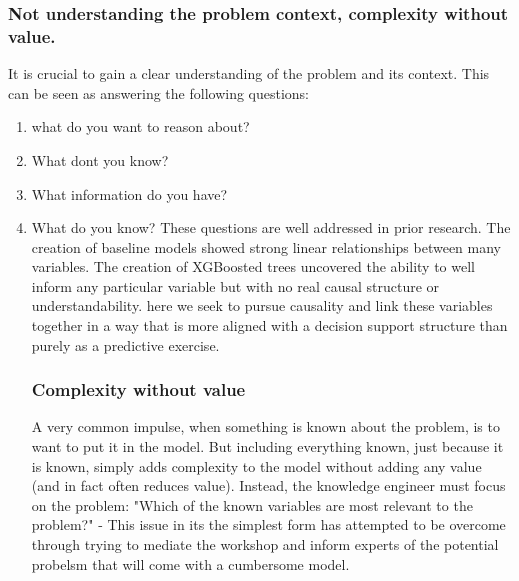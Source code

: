 \subsubsection{Not understanding the problem context, complexity without value.}
It is crucial to gain a clear understanding of the problem and its context. This can be seen as answering the following questions:
\begin{enumerate}
        \item what do you want to reason about?
        \item What dont you know?
        \item What information do you have?
        \item What do you know?
These questions are well addressed in prior research. The creation of baseline models showed strong linear relationships between many variables. The creation of XGBoosted trees uncovered the ability to well inform any particular variable but with no real causal structure or understandability. here we seek to pursue causality and link these variables together in a way that is more aligned with a decision support structure than purely as a predictive exercise.
\subsubsection{Complexity without value}
A very common impulse, when something is known about the problem, is to want to put it in the model. But including everything known, just because it is known, simply adds complexity to the model without adding any value (and in fact often reduces value). Instead, the knowledge engineer must focus on the problem:
"Which of the known variables are most relevant to the problem?"
- This issue in its the simplest form has attempted to be overcome through trying to mediate the workshop and inform experts of the potential probelsm that will come with a cumbersome model.
\end{enumerate}

